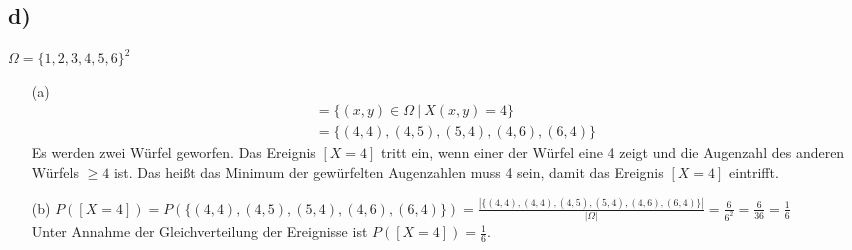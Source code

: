 \documentclass[enabledeprecatedfontcommands, a4paper]{scrartcl}
\begin{document}
\subsection*{d)}
$\Omega = \{1, 2, 3, 4,5 ,6\}^2$
\begin{itemize}
\item[(a)]
\begin{align*}
[X=4]&=\{(x,y) \in \Omega \ | \ X(x,y)=4\}\\
&=\{(4,4),(4,5),(5,4),(4,6),(6,4)\}
\end{align*}
Es werden zwei Würfel geworfen. Das Ereignis $[X=4]$ tritt ein, wenn einer der Würfel eine 4 zeigt und die Augenzahl des anderen Würfels $\ge 4$ ist. Das heißt das Minimum der gewürfelten Augenzahlen muss 4 sein, damit das Ereignis $[X=4]$ eintrifft.
\item[(b)]
$P([X=4])=P(\{(4,4),(4,5),(5,4),(4,6),(6,4)\})=\frac{|\{(4,4),(4,4),(4,5),(5,4),(4,6),(6,4)\}|}{|\Omega|}=\frac{6}{6^2}=\frac{6}{36}=\frac{1}{6}$\\
Unter Annahme der Gleichverteilung der Ereignisse ist $P([X=4])=\frac{1}{6}$.
\end{itemize}
\end{document}

